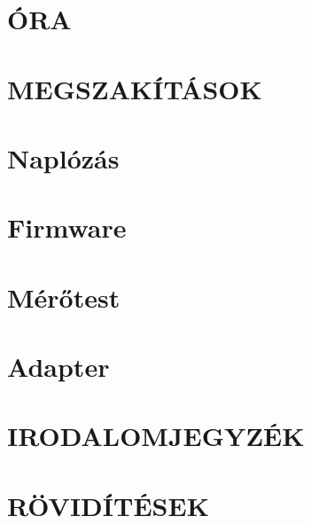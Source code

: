 \section{ÓRA}

\clearpage
\section{MEGSZAKÍTÁSOK}

\clearpage
\section{Naplózás}

\clearpage
\section{Firmware}

\clearpage
\section{Mérőtest}

\clearpage
\section{Adapter}


%












\clearpage
\section{IRODALOMJEGYZÉK}
\printbibliography[heading=none]

\clearpage
\renewcommand{\listfigurename}{ÁBRAJEGYZÉK}
\listoffigures

\clearpage
\renewcommand{\listtablename}{TÁBLAJEGYZÉK}
\listoftables

\clearpage
\section{RÖVIDÍTÉSEK}







